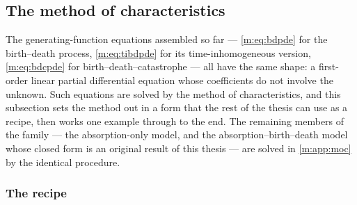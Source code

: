 \subsection{The method of characteristics}
\label{m:sec:moc}

The generating-function equations assembled so far --- \cref{m:eq:bdpde} for the
birth--death process, \cref{m:eq:tibdpde} for its time-inhomogeneous version,
\cref{m:eq:bdcpde} for birth--death--catastrophe --- all have the same shape: a
first-order linear partial differential equation whose coefficients do not
involve the unknown. Such equations are solved by the method of
characteristics, and this subsection sets the method out in a form that the
rest of the thesis can use as a recipe, then works one example through to the
end. The remaining members of the family --- the absorption-only model, and the
absorption--birth--death model whose closed form is an original result of this
thesis --- are solved in \cref{m:app:moc} by the identical procedure.

\subsubsection{The recipe}
\label{m:sec:mocrecipe}

